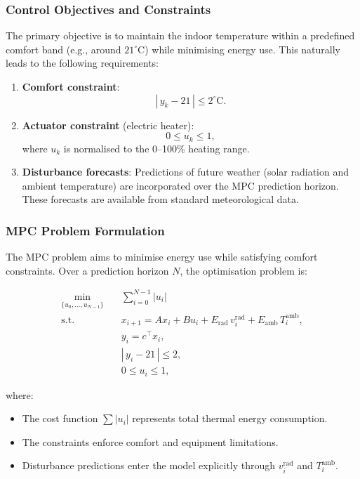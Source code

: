 \subsubsection{Control Objectives and Constraints}

The primary objective is to maintain the indoor temperature within a predefined
comfort band (e.g., around \(21^\circ\mathrm{C}\)) while minimising energy use.  
This naturally leads to the following requirements:
\begin{enumerate}
	\item \textbf{Comfort constraint}:
	\[
	|\,y_k - 21\,| \leq 2^\circ\mathrm{C}.
	\]
	\item \textbf{Actuator constraint} (electric heater):
	\[
	0 \leq u_k \leq 1,
	\]
	where \(u_k\) is normalised to the 0--100\% heating range.
	\item \textbf{Disturbance forecasts}:  
	Predictions of future weather (solar radiation and ambient temperature) 
	are incorporated over the MPC prediction horizon.  
	These forecasts are available from standard meteorological data.
\end{enumerate}

\subsubsection{MPC Problem Formulation}

The MPC problem aims to minimise energy use while satisfying comfort constraints.
Over a prediction horizon \(N\), the optimisation problem is:

\begin{equation*}
	\begin{aligned}
		\min_{\{u_0,\dots,u_{N-1}\}} \quad &
		\sum_{i=0}^{N-1} |u_i|
		\\
		\text{s.t.} \quad &
		x_{i+1} = A x_i + B u_i + E_{\mathrm{rad}}\, v^{\mathrm{rad}}_i
		+ E_{\mathrm{amb}}\, T^{\mathrm{amb}}_i,
		\\
		& y_i = c^\top x_i,
		\\
		& |\,y_i - 21\,| \leq 2,
		\\
		& 0 \leq u_i \leq 1,
	\end{aligned}
\end{equation*}

where:
\begin{itemize}
	\item The cost function \(\sum |u_i|\) represents total thermal energy consumption.
	\item The constraints enforce comfort and equipment limitations.
	\item Disturbance predictions enter the model explicitly through
	\(v^{\mathrm{rad}}_i\) and \(T^{\mathrm{amb}}_i\).
\end{itemize}

